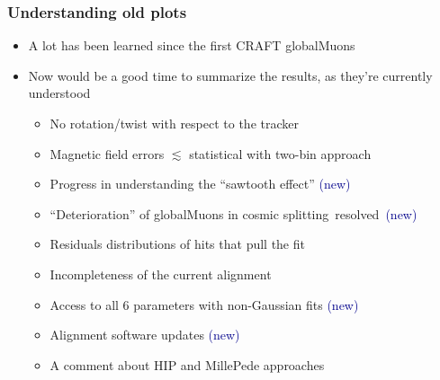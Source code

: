\documentclass[compress]{beamer}
\begin{document}
\begin{frame}
\frametitle{Understanding old plots}
\begin{itemize}\setlength{\itemsep}{0.2 cm}
\item A lot has been learned since the first CRAFT globalMuons
\item Now would be a good time to summarize the results, as they're
  currently understood
\begin{itemize}\setlength{\itemsep}{0.2 cm}
\item No rotation/twist with respect to the tracker
\item Magnetic field errors $\lesssim$ statistical with two-bin approach
\item Progress in understanding the ``sawtooth effect'' \textcolor{darkblue}{(new)}
\item ``Deterioration'' of globalMuons in cosmic \mbox{splitting resolved \textcolor{darkblue}{(new)}\hspace{-1 cm}}
\item Residuals distributions of hits that pull the fit
\item Incompleteness of the current alignment
\item Access to all 6 parameters with non-Gaussian fits \textcolor{darkblue}{(new)}
\item Alignment software updates \textcolor{darkblue}{(new)}
\item A comment about HIP and MillePede approaches
\end{itemize}
\end{itemize}
\end{frame}

\scriptsize
\end{document}

